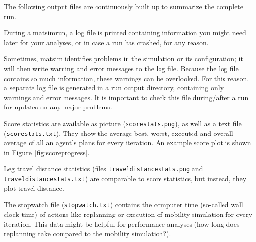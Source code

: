 The following output files are continuously built up to summarize the complete run.
\begin{description}\styleDescription

  \item[Log File:]
During a \gls{matsimrun}, a log file is printed containing information you might need later for your analyses, or in case a run has crashed, for any reason. 

\item[Warnings and Errors Log File:]
Sometimes, \gls{matsim} identifies problems in the simulation or its configuration; it will then write warning and error messages to the log file. Because the log file contains so much information, these warnings can be overlooked. For this reason, a separate log file is generated in a run output directory, containing only warnings and error messages. It is important to check this file during/after a run for updates on any major problems.

\item[Score Statistics:]
Score statistics are available as picture (\lstinline|scorestats.png|), as well as a text file (\lstinline|scorestats.txt|). They show the average best, worst, executed and overall average of all an agent's plans for every iteration. An example score plot is shown in Figure~\ref{fig:scoreprogress}.

\item[Leg Travel Distance Statistics:]
Leg travel distance statistics (files \lstinline|traveldistancestats.png| and \lstinline|traveldistancestats.txt|) are comparable to score statistics, but instead, they plot travel distance. 

\item[Stopwatch:]
The stopwatch file (\lstinline|stopwatch.txt|) contains the computer time (so-called wall clock time) of actions like replanning or execution of mobility simulation for every iteration. This data might be helpful for performance analyses (\eg how long does replanning take compared to the mobility simulation?).

\end{description}



